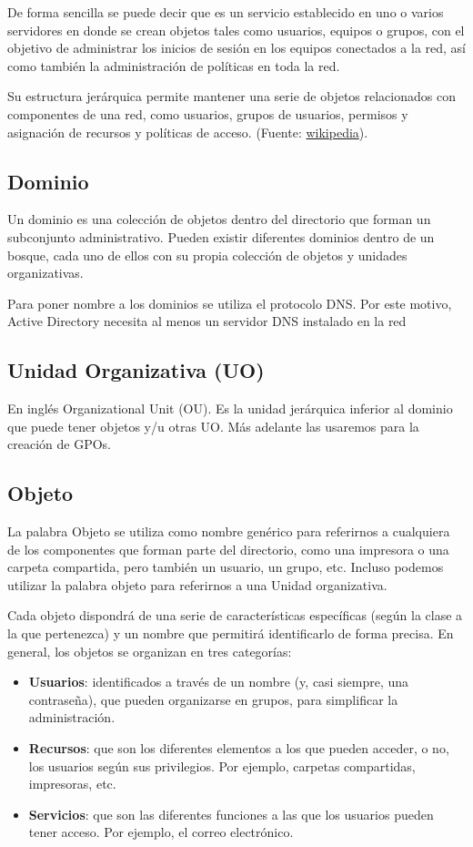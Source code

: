 De forma sencilla se puede decir que es un servicio establecido en uno o varios servidores en donde se crean objetos tales como usuarios, equipos o grupos, con el objetivo de administrar los inicios de sesión en los equipos conectados a la red, así como también la administración de políticas en toda la red.

Su estructura jerárquica permite mantener una serie de objetos relacionados con componentes de una red, como usuarios, grupos de usuarios, permisos y asignación de recursos y políticas de acceso. (Fuente: \href{https://es.wikipedia.org/wiki/Active_Directory}{wikipedia}).


\subsection{Dominio}
Un dominio es una colección de objetos dentro del directorio que forman un subconjunto administrativo. Pueden existir diferentes dominios dentro de un bosque, cada uno de ellos con su propia colección de objetos y unidades organizativas.

Para poner nombre a los dominios se utiliza el protocolo DNS. Por este motivo, Active Directory necesita al menos un servidor DNS instalado en la red

\subsection{Unidad Organizativa (UO)}
En inglés Organizational Unit (OU). Es la unidad jerárquica inferior al dominio que puede tener objetos y/u otras UO. Más adelante las usaremos para la creación de GPOs.



\subsection{Objeto}
La palabra Objeto se utiliza como nombre genérico para referirnos a cualquiera de los componentes que forman parte del directorio, como una impresora o una carpeta compartida, pero también un usuario, un grupo, etc. Incluso podemos utilizar la palabra objeto para referirnos a una Unidad organizativa.

Cada objeto dispondrá de una serie de características específicas (según la clase a la que pertenezca) y un nombre que permitirá identificarlo de forma precisa. En general, los objetos se organizan en tres categorías:
\begin{itemize}
    \item \textbf{Usuarios}: identificados a través de un nombre (y, casi siempre, una contraseña), que pueden organizarse en grupos, para simplificar la administración.
    \item \textbf{Recursos}: que son los diferentes elementos a los que pueden acceder, o no, los usuarios según sus privilegios. Por ejemplo, carpetas compartidas, impresoras, etc.
    \item \textbf{Servicios}: que son las diferentes funciones a las que los usuarios pueden tener acceso. Por ejemplo, el correo electrónico.
\end{itemize}


